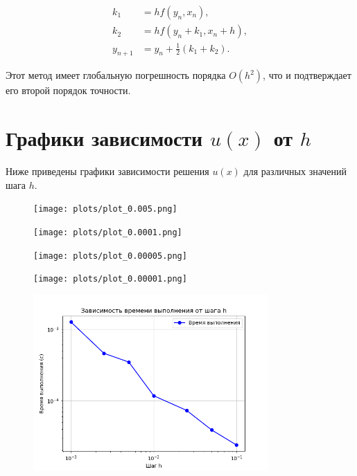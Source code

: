 \documentclass{article}
\begin{document}
\begin{align}
k_1 &= h f(y_n, x_n), \\
k_2 &= h f(y_n + k_1, x_n + h), \\
y_{n+1} &= y_n + \frac{1}{2} (k_1 + k_2).
\end{align}

Этот метод имеет глобальную погрешность порядка $O(h^2)$, что и подтверждает его второй порядок точности.



\section{Графики зависимости $u(x)$ от $h$}

Ниже приведены графики зависимости решения $u(x)$ для различных значений шага $h$.

\begin{figure}[H]
    \centering
    \texttt{[image: plots/plot\_0.005.png]}
\end{figure}


\begin{figure}[H]
    \centering
    \texttt{[image: plots/plot\_0.0001.png]}
\end{figure}

\begin{figure}[H]
    \centering
    \texttt{[image: plots/plot\_0.00005.png]}
\end{figure}


\begin{figure}[H]
    \centering
    \texttt{[image: plots/plot\_0.00001.png]}
\end{figure}



\begin{figure}[H]
    \centering
    \includegraphics[width=0.8\textwidth]{images/timing_plot.png}
\end{figure}
\end{document}
